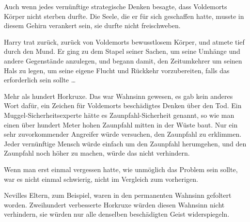Auch wenn jedes vernünftige strategische Denken besagte, dass Voldemorts Körper nicht sterben durfte. Die Seele, die er für sich geschaffen hatte, musste in diesem Gehirn verankert sein, sie durfte nicht freischweben.

Harry trat zurück, zurück von Voldemorts bewusstlosem Körper, und atmete tief durch den Mund. Er ging zu dem Stapel seiner Sachen, um seine Umhänge und andere Gegenstände anzulegen, und begann damit, den Zeitumkehrer um seinen Hals zu legen, um seine eigene Flucht und Rückkehr vorzubereiten, falls das erforderlich sein sollte …

Mehr als hundert Horkruxe.
Das war Wahnsinn gewesen, es gab kein anderes Wort dafür, ein Zeichen für Voldemorts beschädigtes Denken über den Tod. Ein Muggel-Sicherheitsexperte hätte es Zaunpfahl-Sicherheit genannt, so wie man einen über hundert Meter hohen Zaunpfahl mitten in der Wüste baut. Nur ein sehr zuvorkommender Angreifer würde versuchen, den Zaunpfahl zu erklimmen. Jeder vernünftige Mensch würde einfach um den Zaunpfahl herumgehen, und den Zaunpfahl noch höher zu machen, würde das nicht verhindern.

Wenn man erst einmal vergessen hatte, wie unmöglich das Problem sein sollte, war es nicht einmal schwierig, nicht im Vergleich zum vorherigen.

Nevilles Eltern, zum Beispiel, waren in den permanenten Wahnsinn gefoltert worden. Zweihundert verbesserte Horkruxe würden diesen Wahnsinn nicht verhindern, sie würden nur alle denselben beschädigten Geist widerspiegeln.


